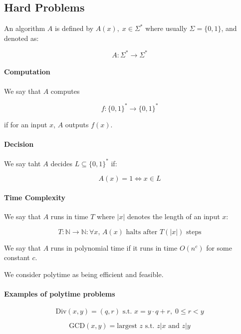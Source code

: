 \documentclass{idc_msc}
\begin{document}
\subsection{Hard Problems}

An algorithm \(A\) is defined by \(A(x),\; x \in \Sigma^*\) where usually \(\Sigma=\{0,1\}\), and denoted as:

\[
  A : \Sigma^* \to \Sigma^*
\]

\paragraph{Computation}

We say that \(A\) computes

\[
  f: \{0,1\}^* \to \{0,1\}^*
\]

if for an input \(x\), \(A\) outputs \(f(x)\).

\paragraph{Decision}

We say taht \(A\) decides \(L \subseteq \{0,1\}^*\) if:

\[
  A(x) = 1 \Leftrightarrow x \in L
\]

\paragraph{Time Complexity}

We say that \(A\) runs in time \(T\) where \(|x|\) denotes the length of an input \(x\):

\[
  T: \mathbb{N} \to \mathbb{N} : \forall x,\, A(x) \text{ halts after \(T(|x|)\) steps}
\]

We say that \(A\) runs in polynomial time if it runs in time \(O(n^c)\) for some constant \(c\).

We consider polytime as being efficient and feasible.

\paragraph{Examples of polytime problems}

\[\textrm{Div}(x,y) = (q,r) \text{ s.t. } x = y \cdot q + r, \; 0 \le r < y\]

\[\textrm{GCD}(x,y) = \text{largest } z \text{ s.t. } z|x \text{ and } z|y\]

\end{document}

